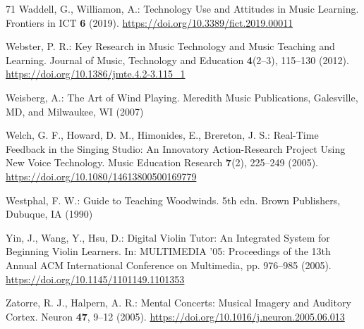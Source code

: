 \documentclass[runningheads]{llncs}
\begin{document}
\begin{thebibliography}{71}
Waddell, G., Williamon, A.: Technology Use and Attitudes in Music Learning. Frontiers in ICT \textbf{6} (2019). \url{https://doi.org/10.3389/fict.2019.00011}

Webster, P. R.: Key Research in Music Technology and Music Teaching and Learning. Journal of Music, Technology and Education \textbf{4}(2--3), 115--130 (2012). \url{https://doi.org/10.1386/jmte.4.2-3.115\_1}

Weisberg, A.: The Art of Wind Playing. Meredith Music Publications, Galesville, MD, and Milwaukee, WI (2007)

Welch, G. F., Howard, D. M., Himonides, E., Brereton, J. S.: Real-Time Feedback in the Singing Studio: An Innovatory Action-Research Project Using New Voice Technology. Music Education Research \textbf{7}(2), 225--249 (2005). \url{https://doi.org/10.1080/14613800500169779}

Westphal, F. W.: Guide to Teaching Woodwinds. 5th edn. Brown Publishers, Dubuque, IA (1990)

Yin, J., Wang, Y., Hsu, D.: Digital Violin Tutor: An Integrated System for Beginning Violin Learners. In: MULTIMEDIA '05: Proceedings of the 13th Annual ACM International Conference on Multimedia, pp. 976--985 (2005). \url{https://doi.org/10.1145/1101149.1101353}

Zatorre, R. J., Halpern, A. R.: Mental Concerts: Musical Imagery and Auditory Cortex. Neuron \textbf{47}, 9--12 (2005). \url{https://doi.org/10.1016/j.neuron.2005.06.013}

\end{thebibliography}
\end{document}
